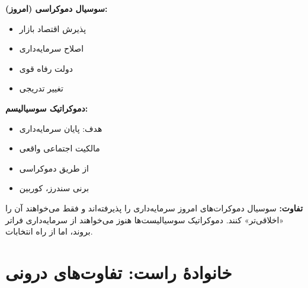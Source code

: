 \begin{tcolorbox}[
    enhanced,
    colback=centergreen!10,
    colframe=centergreen,
    boxrule=1.5pt,
    arc=5pt,
    fonttitle=\bfseries,
    title={\rl{🟢 سوسیال دموکراسی در برابر دموکراتیک سوسیالیسم}}
]

\textbf{سوسیال دموکراسی (امروز):}
\begin{itemize}
    \item پذیرش اقتصاد بازار
    \item اصلاح سرمایه‌داری
    \item دولت رفاه قوی
    \item تغییر تدریجی
\end{itemize}



\textbf{دموکراتیک سوسیالیسم:}
\begin{itemize}
    \item هدف: پایان سرمایه‌داری
    \item مالکیت اجتماعی واقعی
    \item از طریق دموکراسی
    \item برنی سندرز، کوربین
\end{itemize}


\textbf{تفاوت:} سوسیال دموکرات‌های امروز سرمایه‌داری را پذیرفته‌اند و فقط می‌خواهند آن را «اخلاقی‌تر» کنند. دموکراتیک سوسیالیست‌ها هنوز می‌خواهند از سرمایه‌داری فراتر بروند، اما از راه انتخابات.
\end{tcolorbox}

\section*{خانوادهٔ راست: تفاوت‌های درونی}

